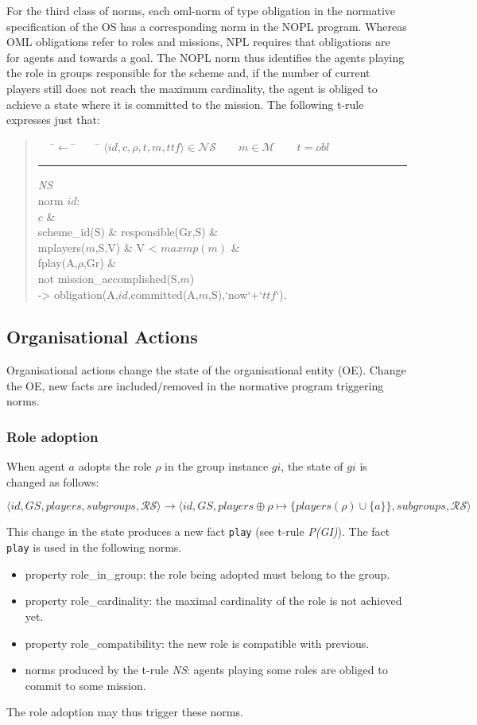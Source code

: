 \documentclass{article}
\newcommand{\set}[1]{\mathcal{#1}}
\newcommand{\andalso}{\quad\quad}
\newcommand{\code}[1]{\texttt{#1}}
\newenvironment{rwrule}[2]
{\begin{quote}\ttfamily\begin{tabbing}~~~\=$\leftarrow$ \= ~~~ \= \kill
     \ensuremath{#2}\\
     \rule[2pt]{6.5cm}{.3pt} \hfill \rwlabel{#1}\\}
{\end{tabbing}\end{quote}}
\newcommand{\rwlabel}[1]{{\scshape\itshape\textrm{#1}}}
\theoremstyle{definition} \newtheorem{definition}{Definition}
\begin{document}
For the third class of norms, each oml-norm of type obligation in the
normative specification of the OS has a corresponding norm in the NOPL
program.
%
Whereas OML obligations refer to roles and missions, NPL requires that
obligations are for agents and towards a goal. The NOPL norm thus
identifies the agents playing the role in groups responsible for the
scheme and, if the number of current players still does not reach the
maximum cardinality, the agent is obliged to achieve a state where it
is committed to the mission.
%
The following t-rule expresses just that:

\begin{rwrule}{NS}
{\langle id, c, \rho, t, m, ttf \rangle \in \mathcal{NS} \andalso m \in \set{M} \andalso t = obl}
norm $id$: \\
\>\>          $c$ \& \\
\>\>          scheme\_id(S) \& responsible(Gr,S) \&\\
\>\>          mplayers($m$,S,V) \& V < $maxmp(m)$ \&\\
\>\>          fplay(A,$\rho$,Gr) \& \\
\>\>          not mission\_accomplished(S,$m$) \\
-> \> obligation(A,$id$,committed(A,$m$,S),`now`+`$ttf$`).
\end{rwrule}


\subsection{Organisational Actions}

Organisational actions change the state of the organisational entity
(OE). Change the OE, new facts are included/removed in the normative
program triggering norms.


\subsubsection{Role adoption}

When agent $a$ adopts the role $\rho$ in the group instance $gi$, the
state of $gi$ is changed as follows:

\[
\langle id, GS, players, subgroups, \set{RS} \rangle  \longrightarrow 
\langle id, GS, players \oplus \rho \mapsto \{ players(\rho) \cup \{a\} \}, subgroups, \set{RS} \rangle  
\]

This change in the state produces a new fact \code{play} (see t-rule
\rwlabel{P(GI)}). The fact \code{play} is used in the following norms.
\begin{itemize}
\item property role\_in\_group: the role being adopted must belong to
  the group.
\item property role\_cardinality: the maximal cardinality of the role
  is not achieved yet.
\item property role\_compatibility: the new role is compatible with previous.
\item norms produced by the t-rule \rwlabel{NS}: agents playing some
  roles are obliged to commit to some mission.
\end{itemize}
The role adoption may thus trigger these norms.
\end{document}
